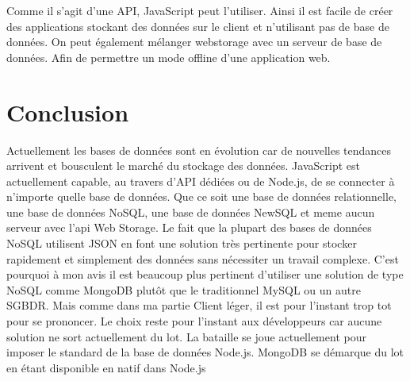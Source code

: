  Comme il s'agit d'une API, JavaScript peut l'utiliser. Ainsi il est facile de créer des applications stockant des données sur le client et n'utilisant pas de base de données. On peut également mélanger webstorage avec un serveur de base de données. Afin de permettre un mode offline d'une application web.

\section{Conclusion}

Actuellement les bases de données sont en évolution car de nouvelles tendances arrivent et bousculent le marché du stockage des données.
JavaScript est actuellement capable, au travers d'API dédiées ou de Node.js, de se connecter à n'importe quelle base de données. Que ce soit une base de données relationnelle, une base de données NoSQL, une base de données NewSQL et meme aucun serveur avec l'api Web Storage. Le fait que la plupart des bases de données NoSQL utilisent JSON en font une solution très pertinente pour stocker rapidement et simplement des données sans nécessiter un travail complexe. C'est pourquoi à mon avis il est beaucoup plus pertinent d'utiliser une solution de type NoSQL comme MongoDB plutôt que le traditionnel MySQL ou un autre SGBDR. Mais comme dans ma partie Client léger, il est pour l'instant trop tot pour se prononcer. Le choix reste pour l'instant aux développeurs car aucune solution ne sort actuellement du lot. La bataille se joue actuellement pour imposer le standard de la base de données Node.js. MongoDB se démarque du lot en étant disponible en natif dans Node.js

